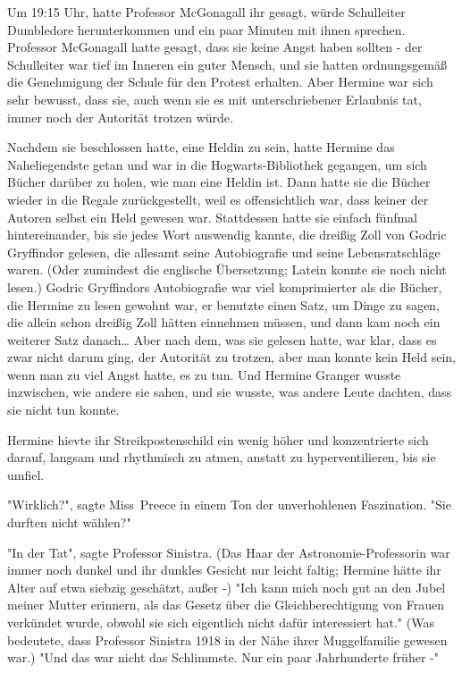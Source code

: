 {Um 19:15 Uhr, hatte Professor McGonagall ihr gesagt, würde Schulleiter Dumbledore herunterkommen und ein paar Minuten mit ihnen sprechen. Professor McGonagall hatte gesagt, dass sie keine Angst haben sollten - der Schulleiter war tief im Inneren ein guter Mensch, und sie hatten ordnungsgemäß die Genehmigung der Schule für den Protest erhalten. Aber Hermine war sich sehr bewusst, dass sie, auch wenn sie es mit unterschriebener Erlaubnis tat, immer noch der Autorität trotzen würde.

Nachdem sie beschlossen hatte, eine Heldin zu sein, hatte Hermine das Naheliegendste getan und war in die Hogwarts-Bibliothek gegangen, um sich Bücher darüber zu holen, wie man eine Heldin ist. Dann hatte sie die Bücher wieder in die Regale zurückgestellt, weil es offensichtlich war, dass keiner der Autoren selbst ein Held gewesen war. Stattdessen hatte sie einfach fünfmal hintereinander, bis sie jedes Wort auswendig kannte, die dreißig Zoll von Godric Gryffindor gelesen, die allesamt seine Autobiografie und seine Lebensratschläge waren. (Oder zumindest die englische Übersetzung; Latein konnte sie noch nicht lesen.) Godric Gryffindors Autobiografie war viel komprimierter als die Bücher, die Hermine zu lesen gewohnt war, er benutzte einen Satz, um Dinge zu sagen, die allein schon dreißig Zoll hätten einnehmen müssen, und dann kam noch ein weiterer Satz danach… Aber nach dem, was sie gelesen hatte, war klar, dass es zwar nicht darum ging, der Autorität zu trotzen, aber man konnte kein Held sein, wenn man zu viel Angst hatte, es zu tun. Und Hermine Granger wusste inzwischen, wie andere sie sahen, und sie wusste, was andere Leute dachten, dass sie nicht tun konnte.

Hermine hievte ihr Streikpostenschild ein wenig höher und konzentrierte sich darauf, langsam und rhythmisch zu atmen, anstatt zu hyperventilieren, bis sie umfiel.

"Wirklich?", sagte Miss~Preece in einem Ton der unverhohlenen Faszination. "Sie durften nicht wählen?"

"In der Tat", sagte Professor Sinistra. (Das Haar der Astronomie-Professorin war immer noch dunkel und ihr dunkles Gesicht nur leicht faltig; Hermine hätte ihr Alter auf etwa siebzig geschätzt, außer -) "Ich kann mich noch gut an den Jubel meiner Mutter erinnern, als das Gesetz über die Gleichberechtigung von Frauen verkündet wurde, obwohl sie sich eigentlich nicht dafür interessiert hat." (Was bedeutete, dass Professor Sinistra 1918 in der Nähe ihrer Muggelfamilie gewesen war.) "Und das war nicht das Schlimmste. Nur ein paar Jahrhunderte früher -"

}
